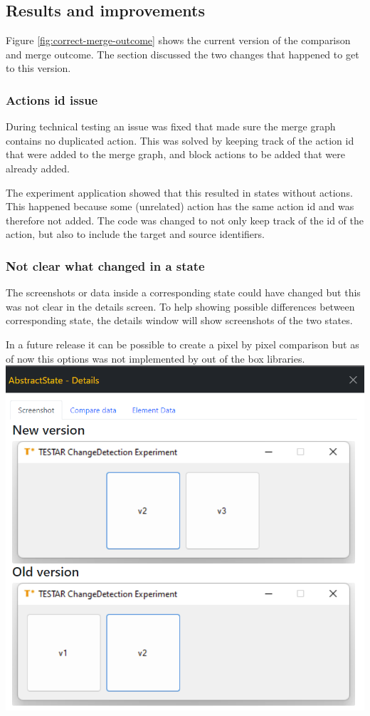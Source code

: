 \subsection{Results and improvements}
Figure \ref{fig:correct-merge-outcome} shows the current version of the comparison and merge outcome. The section discussed the two changes that happened to get to this version.

\subsubsection{Actions id issue}
During technical testing an issue was fixed that made sure the merge graph contains no duplicated action. This was solved by keeping track of the action id that were added to the merge graph, and block actions to be added that were already added.

The experiment application showed that this resulted in states without actions. This happened because some (unrelated) action has the same action id and was therefore not added. The code was changed to not only keep track of the id of the action, but also to include the target and source identifiers.  

\subsubsection{Not clear what changed in a state}
The screenshots or data inside a corresponding state could have changed but this was not clear in the details screen. To help showing possible differences between corresponding state, the details window will show screenshots of the two states. 

In a future release it can be possible to create a pixel by pixel comparison but as of now this options was not implemented by out of the box libraries. \\

\begingroup
\captionsetup{type=figure}
\includegraphics[scale=0.5]{images/6-Screenshot-Side-By-Side.png}
\label{fig:screenshots-side-by-side}
\endgroup